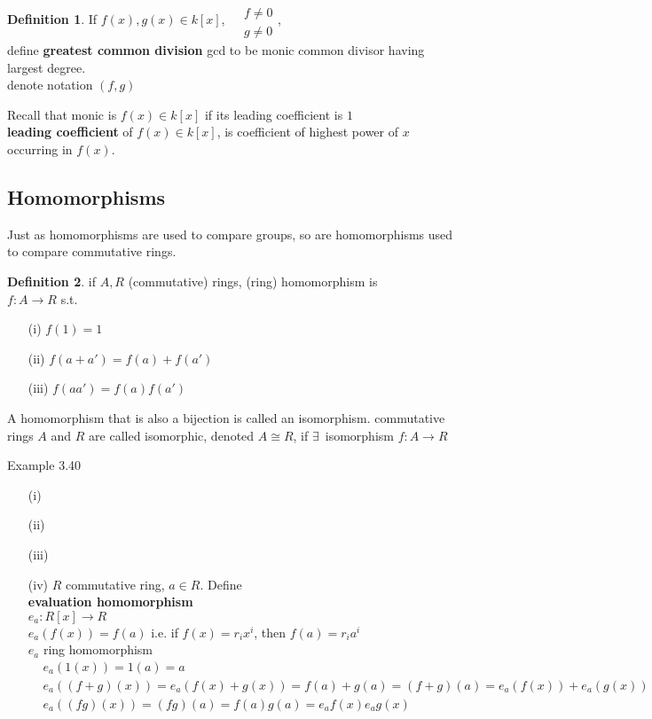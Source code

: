\documentclass[twoside,landscape]{amsart}
\theoremstyle{plain}
\theoremstyle{definition}
\newtheorem{definition}{Definition}
\theoremstyle{remark}
\begin{document}
\begin{multicols*}{2}
\begin{definition}
If $f(x),g(x) \in k[x]$, $\begin{aligned} & \quad \\
& f\neq 0 \\
  & g \neq 0 \end{aligned}$,  \\
define \textbf{greatest common division } gcd to be monic common divisor having largest degree. \\
denote notation $(f,g)$
\end{definition}
Recall that monic is $f(x) \in k[x]$ if its leading coefficient is $1$ \\
\textbf{leading coefficient} of $f(x) \in k[x]$, is coefficient of highest power of $x$ occurring in $f(x)$.  


\subsection{ Homomorphisms }

Just as homomorphisms are used to compare groups, so are homomorphisms used to compare commutative rings.  

\begin{definition} if $A,R$ (commutative) rings, (ring) homomorphism is \\
$f:A\to R$ s.t.
\begin{enumerate}
  \item[(i)] $f(1) = 1 $ 
  \item[(ii)] $f(a+a') = f(a) + f(a')$
  \item[(iii)] $f(aa') = f(a)f(a')$
\end{enumerate}
\end{definition}

A homomorphism that is also a bijection is called an isomorphism.  commutative rings $A$ and $R$ are called isomorphic, denoted $A\cong R$, if $\exists \, $ isomorphism $f:A \to R$

Example 3.40

\begin{enumerate}
\item[(i)]
\item[(ii)]
\item[(iii)]
\item[(iv)] $R$ commutative ring, $a\in R$.  Define \\
\textbf{evaluation homomorphism } \\
$e_a: R[x] \to R$ \\
$e_a(f(x)) = f(a)$ i.e. if $f(x) = r_i x^i$, then $f(a) = r_i a^i$  \\
$e_a$ ring homomorphism
\[
\begin{aligned}
  & e_a(1(x)) = 1(a) = a \\ 
  & e_a((f+g)(x)) = e_a(f(x) + g(x)) = f(a) + g(a) = (f+g)(a) = e_a(f(x)) + e_a(g(x)) \\ 
  & e_a((fg)(x)) = (fg)(a) = f(a) g(a) = e_a f(x) e_a g(x)
\end{aligned}
\]


\end{enumerate}
\end{multicols*}
\end{document}
